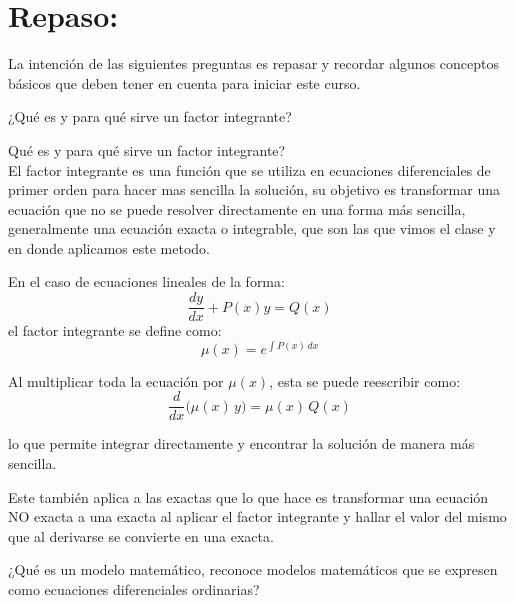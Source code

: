 
\section{Repaso:}

La intención de las siguientes preguntas es repasar y recordar algunos conceptos básicos
que deben tener en cuenta para iniciar este curso.


 ¿Qué es y para qué sirve un factor integrante?

\begin{respuesta}

Qué es y para qué sirve un factor integrante?
\\
El factor integrante es una función que se utiliza en ecuaciones diferenciales de primer orden para hacer mas sencilla la solución, su objetivo es transformar una ecuación que no se puede resolver directamente en una forma más sencilla, generalmente una ecuación exacta o integrable, que son las que vimos el clase y en donde aplicamos este metodo.

En el caso de ecuaciones lineales de la forma:
\[
\frac{dy}{dx} + P(x)y = Q(x)
\]
el factor integrante se define como:
\[
\mu(x) = e^{\int P(x)\,dx}
\]

Al multiplicar toda la ecuación por $\mu(x)$, esta se puede reescribir como:
\[
\frac{d}{dx} \big( \mu(x)\,y \big) = \mu(x)\,Q(x)
\]

lo que permite integrar directamente y encontrar la solución de manera más sencilla.

Este también aplica a las exactas que lo que hace es transformar una ecuación NO exacta a una exacta al aplicar el factor integrante y hallar el valor del mismo que al derivarse se convierte en una exacta.

    \vspace{5cm}
\end{respuesta}

 ¿Qué es un modelo matemático, reconoce modelos matemáticos que se expresen
como ecuaciones diferenciales ordinarias?

